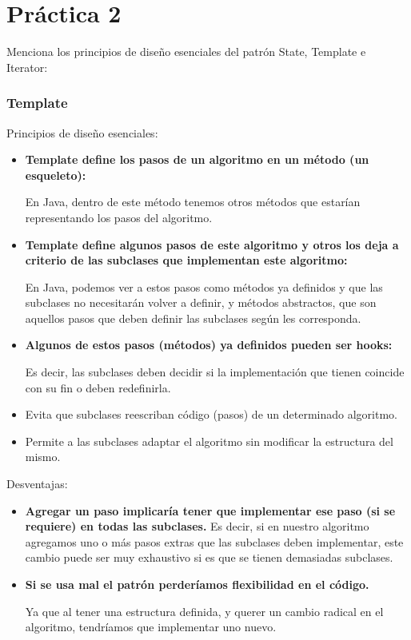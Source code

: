 \documentclass{article}
\begin{document}
	
	\section*{\LARGE{Práctica 2}}

Menciona los principios de diseño esenciales del patrón State, Template e Iterator:

\subsubsection*{Template}
Principios de diseño esenciales:
\newcommand{\localtextbulletone}{\textcolor{black}{\raisebox{.45ex}{\rule{.6ex}{.6ex}}}}
\renewcommand{\labelitemi}{\localtextbulletone}
\begin{itemize}
\item \textbf{Template define los pasos de un algoritmo en un método (un esqueleto):}
  
  En Java, dentro de este método tenemos otros métodos que estarían representando los
  pasos del algoritmo.
\item \textbf{Template define algunos pasos de este algoritmo y otros los deja a
  criterio de las subclases que implementan este algoritmo:}
  
  En Java, podemos ver a estos pasos como métodos ya definidos y que las subclases no
  necesitarán volver a definir, y métodos abstractos, que son aquellos pasos que deben
  definir las subclases según les corresponda.

\item \textbf{Algunos de estos pasos (métodos) ya definidos pueden ser hooks:}
  
  Es decir, las subclases deben decidir si la implementación que tienen coincide
  con su fin o deben redefinirla.
  
\item Evita que subclases reescriban código (pasos) de un determinado algoritmo.
\item Permite a las subclases adaptar el algoritmo sin modificar la estructura del mismo.
\end{itemize}

Desventajas:
\begin{itemize}
  \item \textbf{Agregar un paso implicaría tener que implementar ese paso (si se requiere) en todas las subclases.}
  Es decir, si en nuestro algoritmo agregamos uno o más pasos extras que las subclases deben implementar, este cambio puede ser muy exhaustivo si es que se tienen demasiadas subclases.

\item \textbf{Si se usa mal el patrón perderíamos flexibilidad en el código.}
  
  Ya que al tener una estructura definida, y querer un cambio radical en el algoritmo,
  tendríamos que implementar uno nuevo.  
\end{itemize}
\end{document}
